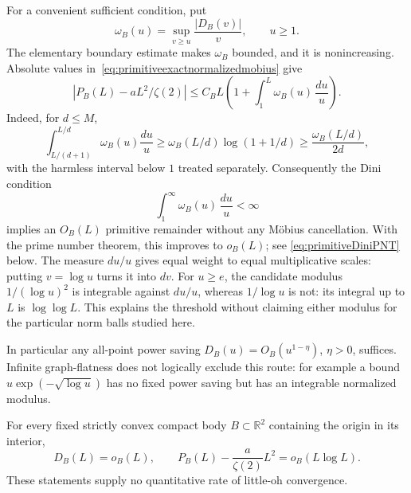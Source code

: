 For a convenient sufficient condition, put
\[
 \omega_B(u)=\sup_{v\ge u}\frac{|D_B(v)|}{v},\qquad u\ge1.
\]
The elementary boundary estimate makes $\omega_B$ bounded, and it is
nonincreasing. Absolute values in~\eqref{eq:primitiveexactnormalizedmobius}
give
\begin{equation}
 |P_B(L)-aL^2/\zeta(2)|
 \le C_B L\left(1+\int_1^L\omega_B(u)\,\frac{du}{u}\right).
 \label{eq:primitiveDini}
\end{equation}
Indeed, for $d\le M$,
\[
 \int_{L/(d+1)}^{L/d}\omega_B(u)\frac{du}{u}
 \ge\omega_B(L/d)\log(1+1/d)
 \ge\frac{\omega_B(L/d)}{2d},
\]
with the harmless interval below $1$ treated separately.
Consequently the Dini condition
\[
 \int_1^\infty\omega_B(u)\,\frac{du}{u}<\infty
\]
implies an $O_B(L)$ primitive remainder without any M\"obius cancellation.
With the prime number theorem, this improves to $o_B(L)$; see
\eqref{eq:primitiveDiniPNT} below.
The measure $du/u$ gives equal weight to equal multiplicative
scales: putting $v=\log u$ turns it into $dv$.
For $u\ge e$, the candidate modulus $1/(\log u)^2$ is
integrable against $du/u$, whereas $1/\log u$ is not: its
integral up to $L$ is $\log\log L$.
This explains the threshold without claiming either modulus for
the particular norm balls studied here.

In particular any all-point power saving $D_B(u)=O_B(u^{1-\eta})$,
$\eta>0$, suffices. Infinite graph-flatness does not logically exclude
this route: for example a bound $u\exp(-\sqrt{\log u})$ has no fixed
power saving but has an integrable normalized modulus.

\begin{proposition}
\label{prop:strictconvexlittleo}
For every fixed strictly convex compact body $B\subset\mathbb R^2$
containing the origin in its interior,
\[
 D_B(L)=o_B(L),\qquad
 P_B(L)-\frac{a}{\zeta(2)}L^2=o_B(L\log L).
\]
These statements supply no quantitative rate of little-oh convergence.
\end{proposition}

